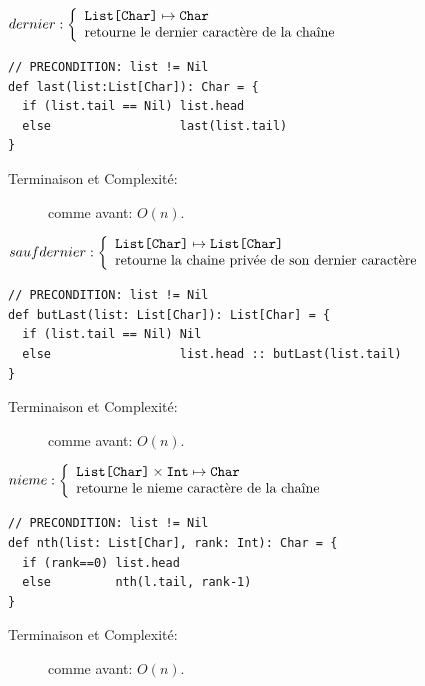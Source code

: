 \documentclass[10pt]{article}\usepackage[correction,nu]{esial}
\begin{document}
\begin{Question}
  $dernier: \left\{
    \begin{array}{l}
      \text{\texttt{List[Char]}}\mapsto \text{\texttt{Char}}\\
      \text{retourne le dernier caractère de la chaîne}
    \end{array}\right.$  
\end{Question}
\begin{Reponse}
  \begin{Verbatim}[]
// PRECONDITION: list != Nil
def last(list:List[Char]): Char = {
  if (list.tail == Nil) list.head
  else                  last(list.tail)
}
  \end{Verbatim}
  \begin{description}
  \item[Terminaison et Complexité:] comme avant: $O(n)$. 
  \end{description}
\end{Reponse}

\begin{Question}
  $saufdernier: \left\{
    \begin{array}{l}
      \text{\texttt{List[Char]}}\mapsto \text{\texttt{List[Char]}}\\
      \text{retourne la chaine privée de son dernier caractère}
    \end{array}\right.$  
\end{Question}
\begin{Reponse}
  \begin{Verbatim}
// PRECONDITION: list != Nil
def butLast(list: List[Char]): List[Char] = {
  if (list.tail == Nil) Nil
  else                  list.head :: butLast(list.tail)
}
  \end{Verbatim}
  \begin{description}
  \item[Terminaison et Complexité:] comme avant: $O(n)$. 
  \end{description}
\end{Reponse}

\begin{Question}
  $nieme: \left\{
    \begin{array}{l}
      \text{\texttt{List[Char]}}\times\text{\texttt{Int}}\mapsto \text{\texttt{Char}}\\
      \text{retourne le nieme caractère de la chaîne}
    \end{array}\right.$  
\end{Question}
\begin{Reponse}
  \begin{Verbatim}
// PRECONDITION: list != Nil
def nth(list: List[Char], rank: Int): Char = {
  if (rank==0) list.head
  else         nth(l.tail, rank-1)
}
  \end{Verbatim}
  \begin{description}
  \item[Terminaison et Complexité:] comme avant: $O(n)$. 
  \end{description}
\end{Reponse}
\end{document}
